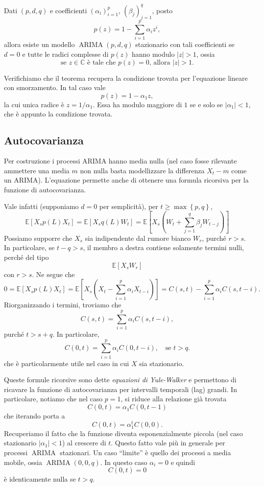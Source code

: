 \documentclass[
  italian,
  letterpaper,
]{book}
\newcommand{\sqa}[1]{\left[ #1 \right]}
\newcommand{\cur}[1]{\left\{ #1 \right\}}
\newcommand{\E}[1]{\mathbb{E}\sqa{#1}}
\theoremstyle{definition}
\theoremstyle{remark}
\begin{document}
Dati \((p,d,q)\) e coefficienti \((\alpha_i)_{i=1}^p\),
\((\beta_j)_{j=1}^q\), posto \[ p(z) = 1- \sum_{i=1}^p \alpha_i z^i,\]
allora esiste un modello \(\operatorname{ARIMA}(p,d,q)\) stazionario con
tali coefficienti se \(d=0\) e tutte le radici complesse di \(p(z)\)
hanno modulo \(|z|>1\), ossia
\[ \text{se $z \in \mathbb{C}$  è tale che $p(z) = 0$, allora $|z|>1$.}\]

Verifichiamo che il teorema recupera la condizione trovata per
l'equazione lineare con smorzamento. In tal caso vale
\[ p(z) =1 -\alpha_1 z,\] la cui unica radice è \(z = 1/\alpha_1\). Essa
ha modulo maggiore di \(1\) se e solo se \(|\alpha_1|<1\), che è appunto
la condizione trovata.

\subsection{Autocovarianza}\label{autocovarianza}

Per costruzione i processi ARIMA hanno media nulla (nel caso fosse
rilevante ammettere una media \(m\) non nulla basta modellizzare la
differenza \(X_t - m\) come un ARIMA). L'equazione permette anche di
ottenere una formula ricorsiva per la funzione di autocovarianza.

Vale infatti (supponiamo \(d=0\) per semplicità), per
\(t\ge \max\cur{p,q}\),
\[  \E{ X_s p(L) X_t} = \E{ X_s q(L) W_t} = \E{ X_s (W_t+\sum_{j=1}^q \beta_j W_{t-j})}\]
Possiamo supporre che \(X_s\) sia indipendente dal rumore bianco
\(W_r\), purché \(r>s\). In particolare, se \(t-q >s\), il membro a
destra contiene solamente termini nulli, perché del tipo
\[ \E{ X_s W_r}\] con \(r>s\). Ne segue che
\[ 0 =  \E{ X_s p(L) X_t } = \E{ X_s (X_t - \sum_{i=1}^p \alpha_i X_{t-i} )} = C(s,t)-\sum_{i=1}^p \alpha_i C(s,t-i).\]
Riorganizzando i termini, troviamo che
\[ C(s,t) = \sum_{i=1}^p \alpha_i C(s, t-i),\] purché \(t > s +q\). In
particolare,
\[ C(0,t) = \sum_{i=1}^p \alpha_i C(0, t-i), \quad \text{se $t>q$.}\]
che è particolarmente utile nel caso in cui \(X\) sia stazionario.

Queste formule ricorsive sono dette \emph{equazioni di Yule-Walker} e
permettono di ricavare la funzione di autocovarianza per intervalli
temporali (lag) grandi. In particolare, notiamo che nel caso \(p=1\), si
riduce alla relazione già trovata \[ C(0,t) = \alpha_1 C(0,t-1)\] che
iterando porta a \[ C(0,t) = \alpha_1^t C(0,0).\] Recuperiamo il fatto
che la funzione diventa esponenzialmente piccola (nel caso stazionario
\(|\alpha_1|<1\)) al crescere di \(t\). Questo fatto vale più in
generale per processi \(\operatorname{ARIMA}\) stazionari. Un caso
``limite'' è quello dei processi a media mobile, ossia
\(\operatorname{ARIMA}(0,0,q)\). In questo caso \(\alpha_i = 0\) e
quindi \[ C(0,t) = 0\] è identicamente nulla se \(t>q\).
\end{document}

